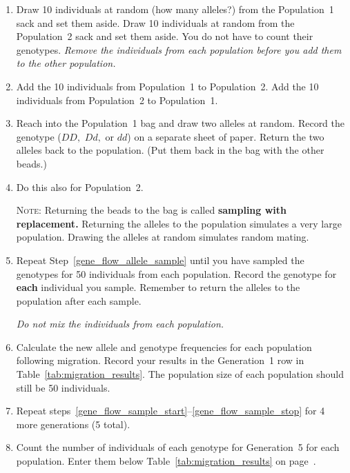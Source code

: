 \documentclass[12pt, hidelinks]{exam}
\newcommand{\allele}[1]{$#1$}
\begin{document}
\begin{questions}
\begin{enumerate}
	\item \label{gene_flow_sample_start}Draw 10 individuals at random (how many alleles?) from the Population~1 sack and set them aside. Draw 10 individuals at random from the Population~2 sack and set them aside. You do not have to count their genotypes. \emph{Remove the individuals from each population before you add them to the other population.}
	
	\item Add the 10 individuals from Population~1 to Population~2. Add the 10 individuals from Population~2 to Population~1. 
	
	\item \label{gene_flow_allele_sample} Reach into the Population~1 bag and draw two alleles at random. Record the genotype (\allele{DD,} \allele{Dd,} or \allele{dd}) on a separate sheet of paper. Return the two alleles back to the population. (Put them back in the bag with the other beads.)
	
	\item Do this also for Population~2.
	
	\textsc{Note:} Returning the beads to the bag is called \textbf{sampling with replacement.} Returning the alleles to the population simulates a very large population. Drawing the alleles at random simulates random mating.
	
	\item Repeat Step~\ref{gene_flow_allele_sample} until you have sampled the genotypes for 50 individuals from each population. Record the genotype for \textbf{each} individual you sample. Remember to return the alleles to the population after each sample. 

 	\emph{Do not mix the individuals from each population.}
	
	\item \label{gene_flow_sample_stop} Calculate the new allele and genotype frequencies for each population following migration. Record your results in the Generation~1 row in Table~\ref{tab:migration_results}. The population size of each population should still be 50 individuals.
	
	\item Repeat steps~\ref{gene_flow_sample_start}–\ref{gene_flow_sample_stop} for 4 more generations (5 total).%
	
	\item Count the number of individuals of each genotype for Generation~5 for each population. Enter them below Table~\ref{tab:migration_results} on page~\pageref{tab:migration_results}. 


\end{enumerate}
\end{questions}
\end{document}
